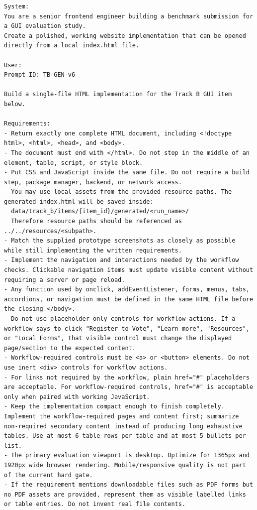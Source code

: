 \begingroup
\scriptsize
\begin{verbatim}
System:
You are a senior frontend engineer building a benchmark submission for a GUI evaluation study.
Create a polished, working website implementation that can be opened directly from a local index.html file.

User:
Prompt ID: TB-GEN-v6

Build a single-file HTML implementation for the Track B GUI item below.

Requirements:
- Return exactly one complete HTML document, including <!doctype html>, <html>, <head>, and <body>.
- The document must end with </html>. Do not stop in the middle of an element, table, script, or style block.
- Put CSS and JavaScript inside the same file. Do not require a build step, package manager, backend, or network access.
- You may use local assets from the provided resource paths. The generated index.html will be saved inside:
  data/track_b/items/{item_id}/generated/<run_name>/
  Therefore resource paths should be referenced as ../../resources/<subpath>.
- Match the supplied prototype screenshots as closely as possible while still implementing the written requirements.
- Implement the navigation and interactions needed by the workflow checks. Clickable navigation items must update visible content without requiring a server or page reload.
- Any function used by onclick, addEventListener, forms, menus, tabs, accordions, or navigation must be defined in the same HTML file before the closing </body>.
- Do not use placeholder-only controls for workflow actions. If a workflow says to click "Register to Vote", "Learn more", "Resources", or "Local Forms", that visible control must change the displayed page/section to the expected content.
- Workflow-required controls must be <a> or <button> elements. Do not use inert <div> controls for workflow actions.
- For links not required by the workflow, plain href="#" placeholders are acceptable. For workflow-required controls, href="#" is acceptable only when paired with working JavaScript.
- Keep the implementation compact enough to finish completely. Implement the workflow-required pages and content first; summarize non-required secondary content instead of producing long exhaustive tables. Use at most 6 table rows per table and at most 5 bullets per list.
- The primary evaluation viewport is desktop. Optimize for 1365px and 1920px wide browser rendering. Mobile/responsive quality is not part of the current hard gate.
- If the requirement mentions downloadable files such as PDF forms but no PDF assets are provided, represent them as visible labelled links or table entries. Do not invent real file contents.

\end{verbatim}
